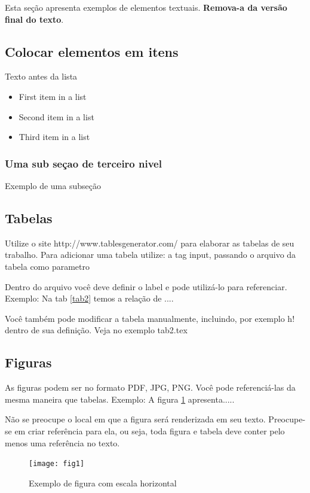 \documentclass[	DIV=calc,%
							paper=a4,%
							fontsize=12pt,%
							onecolumn]{scrartcl}	 					%
\begin{document}
Esta seção apresenta exemplos de elementos textuais. \textbf{Remova-a da versão final do texto}.


\subsection{Colocar elementos em itens}

Texto antes da lista

\begin{itemize}
	\item First item in a list 
	\item Second item in a list 
	\item Third item in a list
\end{itemize}

\subsubsection{Uma sub seçao de terceiro nivel}

Exemplo de uma subseção

\subsection{Tabelas}

Utilize o site http://www.tablesgenerator.com/ para elaborar as tabelas de seu trabalho.
Para adicionar uma tabela utilize: a tag input, passando o arquivo da tabela como parametro



Dentro do arquivo você deve definir o label e pode utilizá-lo para referenciar. Exemplo:
Na tab \ref{tab2} temos a relação de ....


Você também pode modificar a tabela manualmente, incluindo, por exemplo h! dentro de sua definição. Veja no exemplo tab2.tex

\subsection{Figuras}

As figuras podem ser no formato PDF, JPG, PNG. Você pode referenciá-las da mesma maneira que tabelas. Exemplo: A figura \ref{fig1} apresenta.....

Não se preocupe o local em que a figura será renderizada em seu texto. Preocupe-se em criar referência para ela, ou seja, toda figura e tabela deve conter pelo menos uma referência no texto.

\begin{figure}
\centering
\texttt{[image: fig1]}
\caption{Exemplo de figura com escala horizontal}
\label{fig1}
\end{figure}
\end{document}
